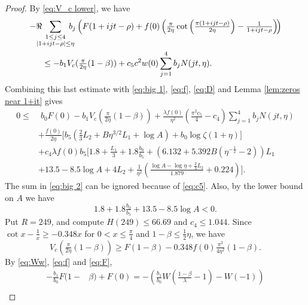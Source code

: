 \documentclass[10pt]{amsart}
\theoremstyle{remark}
\theoremstyle{plain}
\numberwithin{equation}{section}
\theoremstyle{definition}
\def\({\left(}
\def\){\right)}
\def\lam{\lambda}
\def\nts{\negthickspace}
\newcommand{\be}{\begin{equation}}
\newcommand{\rev}[1]{{\color{red}#1}}
\begin{document}
\begin{proof}
By \eqref{eq:V_c lower}, we have
\begin{equation*}
\begin{split}
 - \Re &\nts\nts\nts 
  \sum_{\substack{1\le j\le 4 \\ |1+ijt-\rho| \le \eta}}
  \nts\nts\nts b_j \( F(1+ijt-\rho) + f(0) \( \tfrac{\pi}{2\eta} \cot\(
  \tfrac{\pi(1+ijt-\rho)}{2\eta}\) -\tfrac{1}{1+ijt-\rho} \)\! \)\\
&\le -b_1V_c(\tfrac{\pi}{2\eta}(1-\beta)) + c_5 c^2 w(0) \sum_{j=1}^4
  b_j N(jt,\eta).
\end{split}
\end{equation*}
Combining this last estimate with \eqref{eq:big 1}, \eqref{eq:f},
\eqref{eq:D} and Lemma \ref{lem:zeros near 1+it} gives
\begin{equation}
\begin{split}
0 \le & \; b_0F(0) -b_1 V_c\( \tfrac{\pi}{2\eta}(1-\beta) \)
   + \frac{\lam f(0)}{\eta^2} \(
   \tfrac{\pi^2c_5}{4} - c_4\) \sum_{j=1}^4 b_j N(jt,\eta) \\
& + \frac{f(0)}{2\eta} \biggl[b_5 \( \tfrac23 L_2 + B \eta^{3/2}L_1 +\log A\)
   + b_0 \log \zeta(1+\eta) \biggr] \\
&  +c_4 \lam f(0) b_5 \biggl[\! 1.8 +\tfrac{L_1}{3}+ 1.8\tfrac{b_0}{b_5} +
    \(\!6.132+5.392B (\eta^{-\frac12}-2)\! \) L_1 \\
&  +13.5-8.5\log A +4L_2 + \frac{1}{\eta^2} 
   \( \frac{\log A-\log\eta+\tfrac23 L_2}{1.879}+0.224 \) \biggr].
\end{split}
\label{eq:big 2}
\end{equation}
The sum in \eqref{eq:big 2} can be ignored because of \eqref{eq:c5}.
Also, by the lower bound on $A$ we have
\be
1.8+1.8 \tfrac{b_0}{b_5} + 13.5-8.5\log A < 0.
\label{eq:constants}
\end{equation}
Put $R=249$, and compute \rev{$H(249) \le 66.69$ and $c_4\le 1.044$.}
Since $\cot x - \frac{1}{x} \ge -0.348x$ for $0<x\le \frac{\pi}{4}$ and
$1-\beta \le \frac12 \eta$, we have
\begin{equation}
V_c\( \tfrac{\pi}{2\eta}(1-\beta) \) \ge F(1-\beta)-0.348 f(0) \tfrac{\pi^2}
{4\eta^2} (1-\beta). 
\label{eq:V_c 2}
\end{equation}
By \eqref{eq:Ww}, \eqref{eq:f} and \eqref{eq:F},
\begin{equation}
\begin{split}
-\frac{b_1}{b_0} F(1-&\beta) + F(0)= - \( \frac{b_1}{b_0}
W\( \tfrac{1-\beta}{\lam}-1\) - W(-1) \) \\

\end{split}
\end{equation}
\end{proof}
\end{document}
